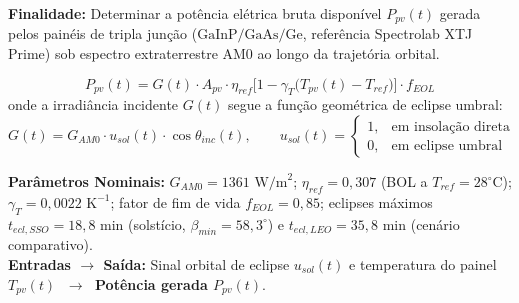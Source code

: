\documentclass[11pt,a4paper]{article}
\begin{document}
\begin{tcolorbox}[colback=boxbg, colframe=bordergreen, title=\color{ifesdark}\textbf{MODELO 1: GERAÇÃO SOLAR ORBITAL (ARRANJO FOTOVOLTAICO AM0)}]
\small
\textbf{Finalidade:} Determinar a potência elétrica bruta disponível $P_{pv}(t)$ gerada pelos painéis de tripla junção ($\text{GaInP/GaAs/Ge}$, referência Spectrolab XTJ Prime) sob espectro extraterrestre AM0 ao longo da trajetória orbital.

\vspace{-4pt}
\begin{equation}
    P_{pv}(t) = G(t) \cdot A_{pv} \cdot \eta_{ref} \Big[ 1 - \gamma_T \big( T_{pv}(t) - T_{ref} \big) \Big] \cdot f_{EOL}
    \label{eq:modelo_pv}
\end{equation}
onde a irradiância incidente $G(t)$ segue a função geométrica de eclipse umbral:
\begin{equation}
    G(t) = G_{AM0} \cdot u_{sol}(t) \cdot \cos\theta_{inc}(t), \qquad
    u_{sol}(t) =
    \begin{cases}
        1, & \text{em insolação direta} \\
        0, & \text{em eclipse umbral}
    \end{cases}
    \label{eq:irradiancia}
\end{equation}

\vspace{2pt}
\noindent\textbf{Parâmetros Nominais:} $G_{AM0} = 1361\text{ W/m}^2$; $\eta_{ref} = 0{,}307$ (BOL a $T_{ref} = 28^\circ\text{C}$); $\gamma_T = 0{,}0022\text{ K}^{-1}$; fator de fim de vida $f_{EOL} = 0{,}85$; eclipses máximos $t_{ecl,SSO} = 18{,}8\text{ min}$ (solstício, $\beta_{min}=58{,}3^\circ$) e $t_{ecl,LEO} = 35{,}8\text{ min}$ (cenário comparativo).\\
\textbf{Entradas $\to$ Saída:} Sinal orbital de eclipse $u_{sol}(t)$ e temperatura do painel $T_{pv}(t)$ $\;\longrightarrow\;$ \textbf{Potência gerada $P_{pv}(t)$}.
\end{tcolorbox}

\vspace{4pt}
\end{document}
